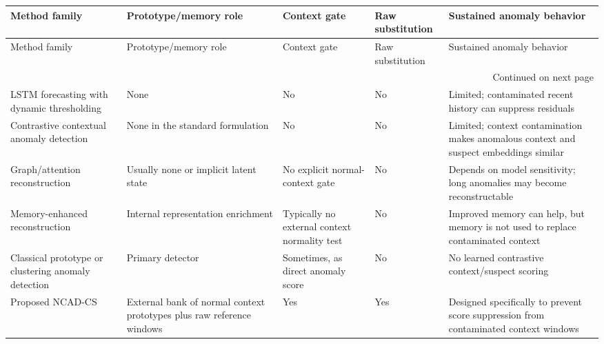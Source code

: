 \begin{longtable}{lllll}
\toprule
Method family & Prototype/memory role & Context gate & Raw substitution & Sustained anomaly behavior \\
\midrule
\endfirsthead
\toprule
Method family & Prototype/memory role & Context gate & Raw substitution & Sustained anomaly behavior \\
\midrule
\endhead
\midrule
\multicolumn{5}{r}{Continued on next page} \\
\midrule
\endfoot
\bottomrule
\endlastfoot
LSTM forecasting with dynamic thresholding & None & No & No & Limited; contaminated recent history can suppress residuals \\
Contrastive contextual anomaly detection & None in the standard formulation & No & No & Limited; context contamination makes anomalous context and suspect embeddings similar \\
Graph/attention reconstruction & Usually none or implicit latent state & No explicit normal-context gate & No & Depends on model sensitivity; long anomalies may become reconstructable \\
Memory-enhanced reconstruction & Internal representation enrichment & Typically no external context normality test & No & Improved memory can help, but memory is not used to replace contaminated context \\
Classical prototype or clustering anomaly detection & Primary detector & Sometimes, as direct anomaly score & No & No learned contrastive context/suspect scoring \\
Proposed NCAD-CS & External bank of normal context prototypes plus raw reference windows & Yes & Yes & Designed specifically to prevent score suppression from contaminated context windows \\
\end{longtable}
